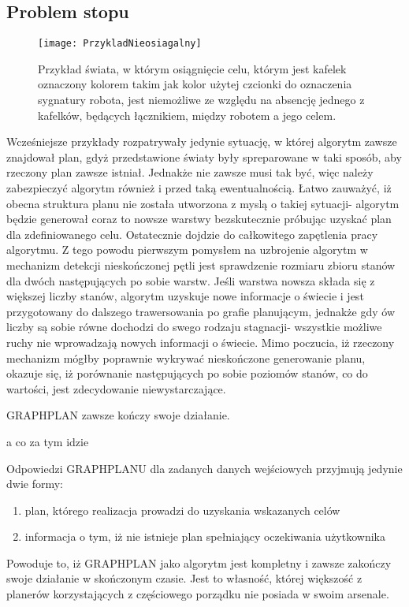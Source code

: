     \subsection{Problem stopu}
    \begin{figure}[H]
        \texttt{[image: PrzykladNieosiagalny]}
        \centering
        \caption{Przykład świata, w którym osiągnięcie celu, którym jest kafelek oznaczony kolorem takim jak kolor użytej czcionki do oznaczenia 
        sygnatury robota, jest niemożliwe ze względu na absencję jednego z kafelków, będących łącznikiem, między robotem a jego celem.}
        \label{PrzykladPlanW1}
    \end{figure}
    Wcześniejsze przykłady rozpatrywały jedynie sytuację, w której algorytm zawsze znajdował plan, gdyż przedstawione światy były spreparowane w taki sposób, 
    aby rzeczony plan zawsze istniał. Jednakże nie zawsze musi tak być, więc należy zabezpieczyć algorytm również i przed taką ewentualnością. Łatwo zauważyć, 
    iż obecna struktura planu nie została utworzona z myslą o takiej sytuacji- algorytm będzie generował coraz to nowsze warstwy bezskutecznie próbując uzyskać 
    plan dla zdefiniowanego celu. Ostatecznie dojdzie do całkowitego zapętlenia pracy algorytmu. 
    Z tego powodu pierwszym pomysłem na uzbrojenie algorytm w mechanizm detekcji nieskończonej pętli jest sprawdzenie rozmiaru zbioru stanów dla dwóch 
    następujących po sobie warstw. Jeśli warstwa nowsza składa się z większej liczby stanów, algorytm uzyskuje nowe informacje o świecie i jest 
    przygotowany do dalszego trawersowania po grafie planującym, jednakże gdy ów liczby są sobie równe dochodzi do swego rodzaju stagnacji- wszystkie 
    możliwe ruchy nie wprowadzają nowych informacji o świecie. Mimo poczucia, iż rzeczony mechanizm mógłby poprawnie wykrywać nieskończone generowanie 
    planu, okazuje się, iż porównanie następujących po sobie poziomów stanów, co do wartości, jest zdecydowanie niewystarczające.

    \begin{corollary}
        GRAPHPLAN zawsze kończy swoje działanie.
    \end{corollary} 

    a co za tym idzie

    \begin{corollary}
        Odpowiedzi GRAPHPLANU dla zadanych danych wejściowych przyjmują jedynie dwie formy:
        \begin{enumerate}
            \item plan, którego realizacja prowadzi do uzyskania wskazanych celów
            \item informacja o tym, iż nie istnieje plan spełniający oczekiwania użytkownika
        \end{enumerate}
    \end{corollary}

    Powoduje to, iż GRAPHPLAN jako algorytm jest kompletny i zawsze zakończy swoje działanie w skończonym czasie. Jest to własność, której większość 
    z planerów korzystających z częściowego porządku nie posiada w swoim arsenale.


    


